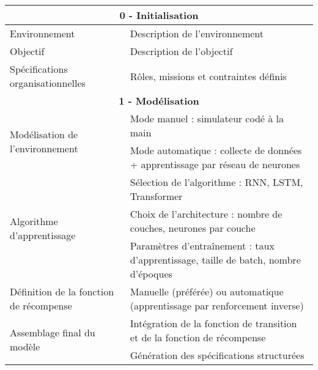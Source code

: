 \begin{table}[h!]
    \centering
    \renewcommand{\arraystretch}{1.3}
    \begin{tabular}{|l|p{10cm}|}
        \hline
        \multicolumn{2}{|c|}{\textbf{0 - Initialisation}}                                                                                     \\ \hline
        Environnement                           & Description de l’environnement                                                              \\ \hline
        Objectif                                & Description de l’objectif                                                                   \\ \hline
        Spécifications organisationnelles       & Rôles, missions et contraintes définis                                                      \\ \hline

        \multicolumn{2}{|c|}{\textbf{1 - Modélisation}}                                                                                       \\ \hline
        \multirow{2}{*}{Modélisation de l’environnement}
                                                & Mode manuel : simulateur codé à la main                                                     \\
                                                & Mode automatique : collecte de données + apprentissage par réseau de neurones               \\ \hline
        \multirow{3}{*}{Algorithme d’apprentissage}
                                                & Sélection de l’algorithme : RNN, LSTM, Transformer                                          \\
                                                & Choix de l’architecture : nombre de couches, neurones par couche                            \\
                                                & Paramètres d’entraînement : taux d’apprentissage, taille de batch, nombre d’époques         \\ \hline
        Définition de la fonction de récompense & Manuelle (préférée) ou automatique (apprentissage par renforcement inverse)                 \\ \hline
        \multirow{2}{*}{Assemblage final du modèle}
                                                & Intégration de la fonction de transition et de la fonction de récompense                    \\
                                                & Génération des spécifications structurées                                                   \\ \hline


\end{tabular}
\end{table}
